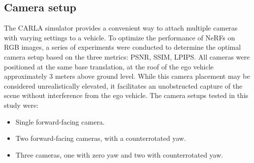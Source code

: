 \subsection{Camera setup} \label{sec:exp-camera-setup}
The CARLA simulator provides a convenient way to attach multiple cameras with varying settings to a vehicle. To optimize the performance of NeRFs on RGB images, a series of experiments were conducted to determine the optimal camera setup based on the three metrics: PSNR, SSIM, LPIPS. All cameras were positioned at the same base translation, at the roof of the ego vehicle approximately 3 meters above ground level. While this camera placement may be considered unrealistically elevated, it facilitates an unobstructed capture of the scene without interference from the ego vehicle. The camera setups tested in this study were:

\begin{itemize}
    \item Single forward-facing camera.
    \item Two forward-facing cameras, with a counterrotated yaw.
    \item Three cameras, one with zero yaw and two with counterrotated yaw.
\end{itemize}

